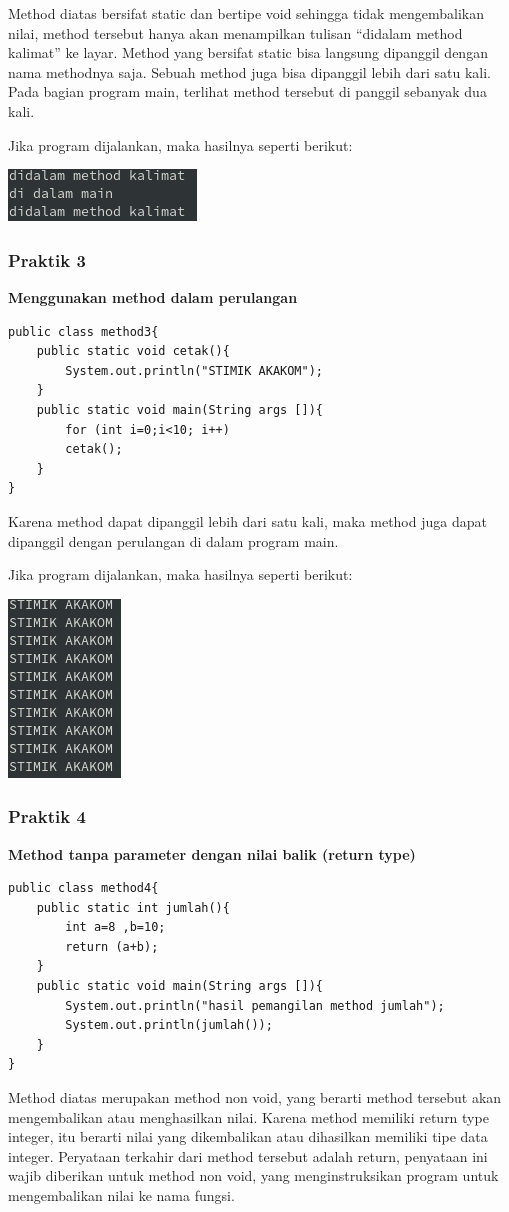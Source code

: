 \documentclass[a4paper,12pt]{article}
\begin{document}
Method diatas bersifat static dan bertipe void sehingga tidak mengembalikan nilai, method tersebut hanya akan menampilkan tulisan
``didalam method kalimat'' ke layar. Method yang bersifat static bisa langsung dipanggil dengan nama methodnya saja. Sebuah method juga
bisa dipanggil lebih dari satu kali. Pada bagian program main, terlihat method tersebut di panggil sebanyak dua kali.

Jika program dijalankan, maka hasilnya seperti berikut:
\begin{center}
    \includegraphics{2.png} 
\end{center}

\subsubsection{Praktik 3}
\textbf{Menggunakan method dalam perulangan}
\begin{lstlisting}
public class method3{
	public static void cetak(){
		System.out.println("STIMIK AKAKOM");
	}
	public static void main(String args []){
		for (int i=0;i<10; i++)
		cetak();
	}
}
\end{lstlisting}
Karena method dapat dipanggil lebih dari satu kali, maka method juga dapat dipanggil dengan perulangan di dalam program
main.

Jika program dijalankan, maka hasilnya seperti berikut:
\begin{center}
    \includegraphics{3.png} 
\end{center}

\subsubsection{Praktik 4}
\textbf{Method tanpa parameter dengan nilai balik (return type)}
\begin{lstlisting}
public class method4{
	public static int jumlah(){
		int a=8 ,b=10;
		return (a+b);
	}
	public static void main(String args []){
		System.out.println("hasil pemangilan method jumlah");
		System.out.println(jumlah());
	}
}
\end{lstlisting}
Method diatas merupakan method non void, yang berarti method tersebut akan mengembalikan atau menghasilkan nilai. Karena
method memiliki return type integer, itu berarti nilai yang dikembalikan atau dihasilkan memiliki tipe data integer.
Peryataan terkahir dari method tersebut adalah return, penyataan ini wajib diberikan untuk method non void, yang
menginstruksikan program untuk mengembalikan nilai ke nama fungsi.
\end{document}
